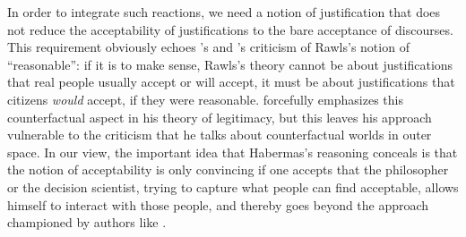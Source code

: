\documentclass[preprint, french, english, 11pt, authoryear]{elsarticle}%
\begin{document}
In order to integrate such reactions, we need a notion of justification that does not reduce the acceptability of justifications to the bare acceptance of discourses. 
This requirement obviously echoes \citeauthor{habermas_reconciliation_1995}’s and \citeauthor{estlund_democratic_2009}’s criticism of Rawls's notion of “reasonable”: 
if it is to make sense, Rawls's theory cannot be about justifications that real people usually accept or will accept, it must be about justifications that citizens \emph{would} accept, if they were reasonable. 
\citet{habermas_faktizitat_1992} forcefully emphasizes this counterfactual aspect in his theory of legitimacy, but this leaves his approach vulnerable to the criticism that he talks about counterfactual worlds in outer space. 
In our view, the important idea that Habermas's reasoning conceals is that the notion of acceptability is only convincing if one accepts that the philosopher or the decision scientist, trying to capture what people can find acceptable, 
allows himself to interact with those people, and thereby goes beyond the approach championed by authors like \cite{boltanski_justification_2006}.


\end{document}
